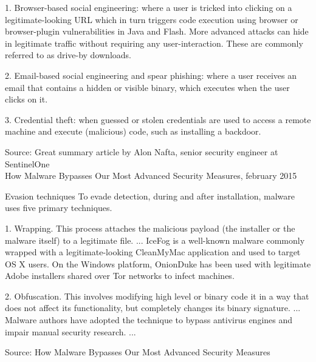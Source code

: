 \documentclass[20pt,landscape,a4paper,footrule]{foils}
\begin{document}
\begin{list2}
\item 1. Browser-based social engineering: where a user is tricked into clicking on a legitimate-looking URL which in turn triggers code execution using browser or browser-plugin vulnerabilities in Java and Flash. More advanced attacks can hide in legitimate traffic without requiring any user-interaction. These are commonly referred to as drive-by downloads.
\item 2. Email-based social engineering and spear phishing: where a user receives an email that contains a hidden or visible binary, which executes when the user clicks on it.
\item 3. Credential theft: when guessed or stolen credentials are used to access a remote machine and execute (malicious) code, such as installing a backdoor.
\end{list2}

{\small Source: Great summary article by Alon Nafta, senior security engineer at SentinelOne\\
How Malware Bypasses Our Most Advanced Security Measures, february 2015}\\
{\tiny{}}




Evasion techniques
To evade detection, during and after installation, malware uses five primary techniques.
\begin{list1}
\item 1. Wrapping. This process attaches the malicious payload (the installer or the malware itself) to a legitimate file.
... IceFog is a well-known malware commonly wrapped with a legitimate-looking CleanMyMac application and used to target OS X users. On the Windows platform, OnionDuke has been used with legitimate Adobe installers shared over Tor networks to infect machines.
\item 2. Obfuscation. This involves modifying high level or binary code it in a way that does not affect its functionality, but completely changes its binary signature. ... Malware authors have adopted the technique to bypass antivirus engines and impair manual security research. ...
\end{list1}

Source: How Malware Bypasses Our Most Advanced Security Measures\\
{\tiny{}}
\end{document}
